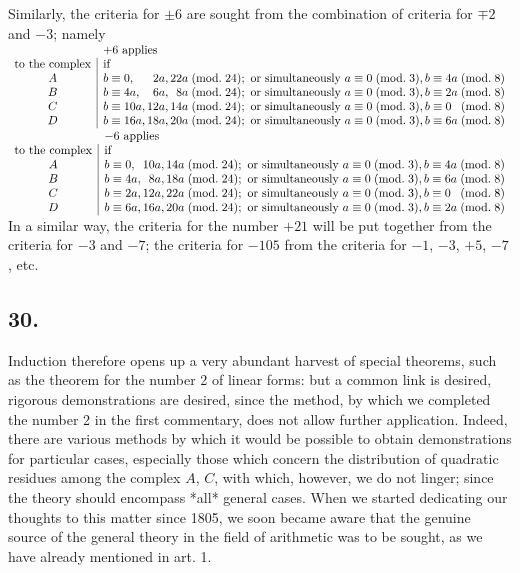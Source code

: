 \documentclass[twoside,12pt, showframe]{memoir}
\renewcommand{\pmod}[1]{\;(\textrm{mod.}\;#1)}
\begin{document}
\(\)Similarly, the criteria for \(\pm 6\) are sought from the combination of criteria for \(\mp 2\) and \(-3\); namely\\
\(\begin{array}{c|l}
\multicolumn{1}{c}{}&\multicolumn{1}{l}{+6\text{ applies}}\\
\text{to the complex}&\text{if}\\
A & b \equiv 0, \phantom{00a}2a, 22a \pmod{24}; \text{ or simultaneously } a \equiv 0 \pmod{3}, b \equiv 4a \pmod{8} \\
B & b \equiv 4a, \phantom{00}6a, \phantom{0}8a \pmod{24}; \text{ or simultaneously } a \equiv 0 \pmod{3}, b \equiv 2a \pmod{8} \\
C & b \equiv 10a, 12a, 14a \pmod{24}; \text{ or simultaneously } a \equiv 0 \pmod{3}, b \equiv 0\phantom{a} \pmod{8} \\
D & b \equiv 16a, 18a, 20a \pmod{24}; \text{ or simultaneously } a \equiv 0 \pmod{3}, b \equiv 6a \pmod{8}
\end{array}\)\\
\(\begin{array}{c|l}
\multicolumn{1}{c}{}&\multicolumn{1}{l}{-6\text{ applies}}\\
\text{to the complex}&\text{if}\\
A & b \equiv 0,\phantom{a} 10a, 14a \pmod{24}; \text{ or simultaneously } a \equiv 0 \pmod{3}, b \equiv 4a \pmod{8} \\
B & b \equiv 4a, \phantom{0}8a, 18a \pmod{24}; \text{ or simultaneously } a \equiv 0 \pmod{3}, b \equiv 6a \pmod{8} \\
C & b \equiv 2a, 12a, 22a \pmod{24}; \text{ or simultaneously } a \equiv 0 \pmod{3}, b \equiv 0\phantom{a} \pmod{8} \\
D & b \equiv 6a, 16a, 20a \pmod{24}; \text{ or simultaneously } a \equiv 0 \pmod{3}, b \equiv 2a \pmod{8}
\end{array}\)\\

In a similar way, the criteria for the number \(+21\) will be put together from the criteria for \(-3\) and \(-7\); the criteria for \(-105\) from the criteria for \(-1\), \(-3\), \(+5\), \(-7\), etc.
%

\subsection*{30.}

Induction therefore opens up a very abundant harvest of special theorems, such as the theorem for the number 2 of linear forms: but a common link is desired, rigorous demonstrations are desired, since the method, by which we completed the number 2 in the first commentary, does not allow further application. Indeed, there are various methods by which it would be possible to obtain demonstrations for particular cases, especially those which concern the distribution of quadratic residues among the complex \(A\), \(C\), with which, however, we do not linger; since the theory should encompass *all* general cases. When we started dedicating our thoughts to this matter since 1805, we soon became aware that the genuine source of the general theory in the field of arithmetic was to be sought, as we have already mentioned in art. 1.
\end{document}
